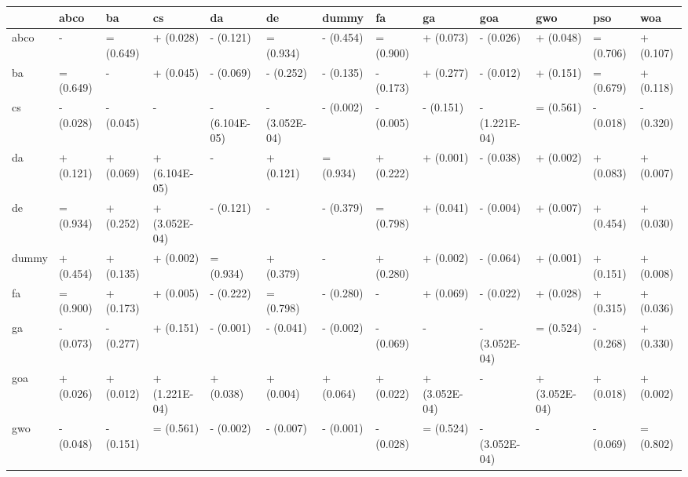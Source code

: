 \begin{table}
    \centering
    \begin{adjustbox}{width=\linewidth}
        \begin{tabular}{lllllllllllll}
            \toprule
            {}    & abco      & ba        & cs            & da            & de            & dummy     & fa        & ga            & goa           & gwo           & pso       & woa       \\
            \midrule
            abco  & -         & = (0.649) & + (0.028)     & - (0.121)     & = (0.934)     & - (0.454) & = (0.900) & + (0.073)     & - (0.026)     & + (0.048)     & = (0.706) & + (0.107) \\
            ba    & = (0.649) & -         & + (0.045)     & - (0.069)     & - (0.252)     & - (0.135) & - (0.173) & + (0.277)     & - (0.012)     & + (0.151)     & = (0.679) & + (0.118) \\
            cs    & - (0.028) & - (0.045) & -             & - (6.104E-05) & - (3.052E-04) & - (0.002) & - (0.005) & - (0.151)     & - (1.221E-04) & = (0.561)     & - (0.018) & - (0.320) \\
            da    & + (0.121) & + (0.069) & + (6.104E-05) & -             & + (0.121)     & = (0.934) & + (0.222) & + (0.001)     & - (0.038)     & + (0.002)     & + (0.083) & + (0.007) \\
            de    & = (0.934) & + (0.252) & + (3.052E-04) & - (0.121)     & -             & - (0.379) & = (0.798) & + (0.041)     & - (0.004)     & + (0.007)     & + (0.454) & + (0.030) \\
            dummy & + (0.454) & + (0.135) & + (0.002)     & = (0.934)     & + (0.379)     & -         & + (0.280) & + (0.002)     & - (0.064)     & + (0.001)     & + (0.151) & + (0.008) \\
            fa    & = (0.900) & + (0.173) & + (0.005)     & - (0.222)     & = (0.798)     & - (0.280) & -         & + (0.069)     & - (0.022)     & + (0.028)     & + (0.315) & + (0.036) \\
            ga    & - (0.073) & - (0.277) & + (0.151)     & - (0.001)     & - (0.041)     & - (0.002) & - (0.069) & -             & - (3.052E-04) & = (0.524)     & - (0.268) & + (0.330) \\
            goa   & + (0.026) & + (0.012) & + (1.221E-04) & + (0.038)     & + (0.004)     & + (0.064) & + (0.022) & + (3.052E-04) & -             & + (3.052E-04) & + (0.018) & + (0.002) \\
            gwo   & - (0.048) & - (0.151) & = (0.561)     & - (0.002)     & - (0.007)     & - (0.001) & - (0.028) & = (0.524)     & - (3.052E-04) & -             & - (0.069) & = (0.802) \\

\end{tabular}
\end{adjustbox}
\end{table}
